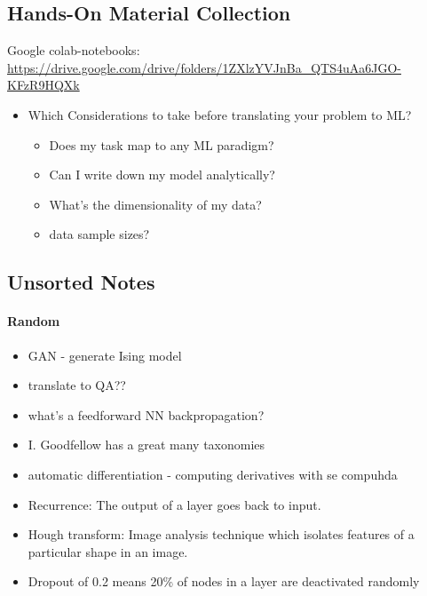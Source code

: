 \subsection{Hands-On Material Collection}
Google colab-notebooks:\\
\url{https://drive.google.com/drive/folders/1ZXlzYVJnBa_QTS4uAa6JGO-KFzR9HQXk}

\begin{itemize}
  \item Which Considerations to take before translating your problem to ML?
  \begin{itemize}
    \item Does my task map to any ML paradigm?
	\item Can I write down my model analytically?
	\item What's the dimensionality of my data?
	\item data sample sizes?
  \end{itemize}
\end{itemize}

\subsection{Unsorted Notes}
\paragraph{Random}
\begin{itemize}
  \item GAN - generate Ising model
  \item translate to QA??
  \item what's a feedforward NN backpropagation?
  \item I. Goodfellow has a great many taxonomies
  \item automatic differentiation - computing derivatives with se compuhda
  \item Recurrence: The output of a layer goes back to input.
  \item Hough transform: Image analysis technique which isolates features of a particular shape in an image.
  \item Dropout of 0.2 means 20\% of nodes in a layer are deactivated randomly
\end{itemize}




